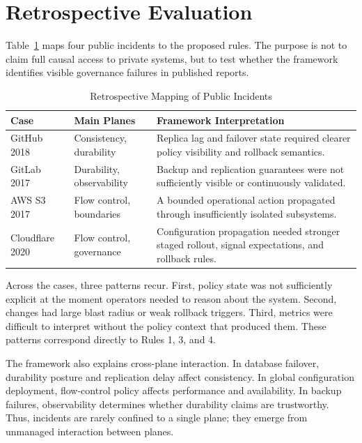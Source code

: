 \documentclass[conference]{IEEEtran}
\begin{document}
\section{Retrospective Evaluation}

Table~\ref{tab:evaluation} maps four public incidents to the proposed rules. The purpose is not to claim full causal access to private systems, but to test whether the framework identifies visible governance failures in published reports.

\begin{table}[t]
\caption{Retrospective Mapping of Public Incidents}
\label{tab:evaluation}
\centering
\small
\begin{tabular}{@{}p{1.15cm}p{1.65cm}p{3.05cm}@{}}
\toprule
\textbf{Case} & \textbf{Main Planes} & \textbf{Framework Interpretation} \\
\midrule
GitHub 2018~\cite{github2018} & Consistency, durability & Replica lag and failover state required clearer policy visibility and rollback semantics. \\
GitLab 2017~\cite{gitlab2017} & Durability, observability & Backup and replication guarantees were not sufficiently visible or continuously validated. \\
AWS S3 2017~\cite{aws2017} & Flow control, boundaries & A bounded operational action propagated through insufficiently isolated subsystems. \\
Cloudflare 2020~\cite{cloudflare2020} & Flow control, governance & Configuration propagation needed stronger staged rollout, signal expectations, and rollback rules. \\
\bottomrule
\end{tabular}
\end{table}

Across the cases, three patterns recur. First, policy state was not sufficiently explicit at the moment operators needed to reason about the system. Second, changes had large blast radius or weak rollback triggers. Third, metrics were difficult to interpret without the policy context that produced them. These patterns correspond directly to Rules 1, 3, and 4.

The framework also explains cross-plane interaction. In database failover, durability posture and replication delay affect consistency. In global configuration deployment, flow-control policy affects performance and availability. In backup failures, observability determines whether durability claims are trustworthy. Thus, incidents are rarely confined to a single plane; they emerge from unmanaged interaction between planes.
\end{document}
